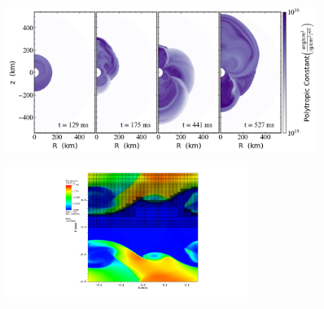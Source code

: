 \documentclass{beamer}
\begin{document}
\begin{frame}

  \begin{figure}[htb!]
    \centering
    \includegraphics[width=0.9\textwidth]{fig.sasi.png}
  \end{figure}

\end{frame}

\begin{frame}

  \begin{figure}[htb!]
    \centering
    \includegraphics[width=0.7\textwidth]{fig.KHI.pdf}
  \end{figure}

\end{frame}
\end{document}
